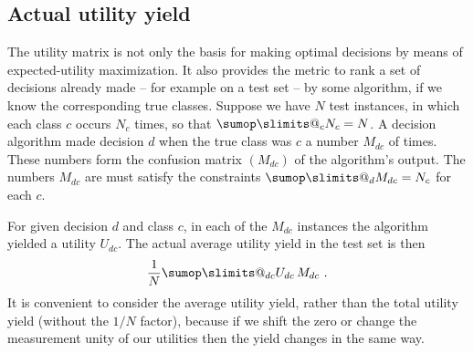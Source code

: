 \documentclass[\ifafour a4paper,12pt,\else a5paper,10pt,\fi%
onecolumn,oneside,article,%
british%
]{memoir}
\makeatletter
\theoremstyle{remark}
\theoremstyle{innote}
\def\sum{\DOTSI\sumop\slimits@}
\renewcommand*{\|}[1][]{\nonscript\:#1\vert\nonscript\:\mathopen{}}
\newcommand*{\nd}{n_{\textrm{d}}}
\newcommand*{\nc}{n_{\textrm{c}}}
\makeatother
\begin{document}
\subsection{Actual utility yield}
\label{sec:dt_utility_yield}

The utility matrix is not only the basis for making optimal decisions by means of expected-utility maximization. It also provides the metric to rank a set of decisions already made -- for example on a test set -- by some algorithm, if we know the corresponding true classes. Suppose we have $N$ test instances, in which each class $c$ occurs $N_{c}$ times, so that $\sum_{c} N_{c} = N$. A decision algorithm made decision $d$ when the true class was $c$ a number $M_{dc}$ of times. These numbers form the confusion matrix $(M_{dc})$ of the algorithm's output. The numbers $M_{dc}$ are must satisfy the constraints $\sum_{d} M_{dc} = N_{c}$ for each $c$.

For given decision $d$ and class $c$, in each of the $M_{dc}$ instances the algorithm yielded a utility $U_{dc}$. The actual average utility yield in the test set is then
\begin{equation}
  \label{eq:utility_gained}
 \frac{1}{N} \sum_{dc} U_{dc}\, M_{dc} \ .
\end{equation}
It is convenient to consider the average utility yield, rather than the total utility yield (without the $1/N$ factor), because if we shift the zero or change the measurement unity of our utilities then the yield changes in the same way.



\end{document}
